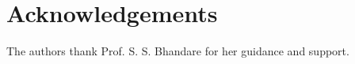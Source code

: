 \documentclass[3p,times,procedia]{elsarticle}
\begin{document}
\section*{Acknowledgements}
The authors thank Prof. S. S. Bhandare for her guidance and support.



\end{document}
